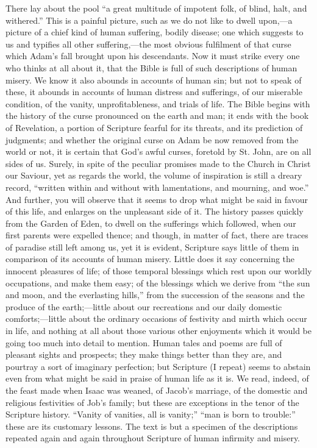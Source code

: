 There lay about the pool ``a great multitude of
impotent folk, of blind, halt, and withered.'' This
is a painful picture, such as we do not like to dwell
upon,—a picture of a chief kind of human suffering,
bodily disease; one which suggests to us and typifies all
other suffering,—the most obvious fulfilment of that
curse which Adam's fall brought upon his descendants. Now
it must strike every one who thinks at all about it, that
the Bible is full of such descriptions of human misery.
We know it also abounds in accounts of human sin; but not
to speak of these, it abounds in accounts of human
distress and sufferings, of our miserable condition, of
the vanity, unprofitableness, and trials of life. The
Bible begins with the history of the curse pronounced on
the earth and man; it ends with the book of Revelation, a
portion of Scripture fearful for its threats, and its
prediction of judgments; and whether the original curse
on Adam be now removed from the world or not, it is
certain that God's awful curses, foretold by St. John,
are on all sides of us. Surely, in spite of the peculiar
promises made to the Church in Christ our Saviour, yet as
regards the world, the volume of inspiration is still a
dreary record, ``written within and without with
lamentations, and mourning, and woe.'' And further,
you will observe that it seems to drop what might be said
in favour of this life, and enlarges on the unpleasant
side of it. The history passes quickly from the Garden of
Eden, to dwell on the sufferings which followed, when our
first parents were expelled thence; and though, in matter
of fact, there are traces of paradise still left among
us, yet it is evident, Scripture says little of them in
comparison of its accounts of human misery. Little does
it say concerning the innocent pleasures of life; of
those temporal blessings which rest upon our worldly
occupations, and make them easy; of the blessings which
we derive from ``the sun and moon, and the
everlasting hills,'' from the succession of the
seasons and the produce of the earth;—little about
our recreations and our daily domestic
comforts;—little about the ordinary occasions of
festivity and mirth which occur in life, and nothing at
all about those various other enjoyments which it would
be going too much into detail to mention. Human tales and
poems are full of pleasant sights and prospects; they
make things better than they are, and pourtray a sort of
imaginary perfection; but Scripture (I repeat) seems to
abstain even from what might be said in praise of human
life as it is. We read, indeed, of the feast made when
Isaac was weaned, of Jacob's marriage, of the domestic
and religious festivities of Job's family; but these are
exceptions in the tenor of the Scripture history.
``Vanity of vanities, all is vanity;'' ``man
is born to trouble:'' these are its customary
lessons. The text is but a specimen of the descriptions
repeated again and again throughout Scripture of human
infirmity and misery.

